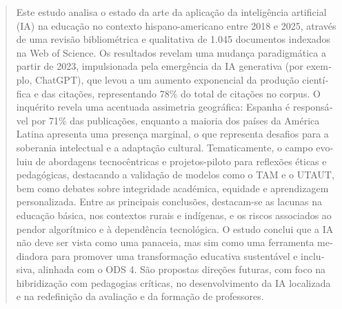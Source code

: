 \documentclass[spanish]{textolivre}
\begin{document}
\begin{polyabstract}
\begin{portuguese}
\begin{abstract}
Este estudo analisa o estado da arte da aplicação da inteligência artificial (IA) na educação no contexto hispano-americano entre 2018 e 2025, através de uma revisão bibliométrica e qualitativa de 1.045 documentos indexados na Web of Science. Os resultados revelam uma mudança paradigmática a partir de 2023, impulsionada pela emergência da IA generativa (por exemplo, ChatGPT), que levou a um aumento exponencial da produção científica e das citações, representando 78\% do total de citações no corpus. O inquérito revela uma acentuada assimetria geográfica: Espanha é responsável por 71\% das publicações, enquanto a maioria dos países da América Latina apresenta uma presença marginal, o que representa desafios para a soberania intelectual e a adaptação cultural. Tematicamente, o campo evoluiu de abordagens tecnocêntricas e projetos-piloto para reflexões éticas e pedagógicas, destacando a validação de modelos como o TAM e o UTAUT, bem como debates sobre integridade académica, equidade e aprendizagem personalizada. Entre as principais conclusões, destacam-se as lacunas na educação básica, nos contextos rurais e indígenas, e os riscos associados ao pendor algorítmico e à dependência tecnológica. O estudo conclui que a IA não deve ser vista como uma panaceia, mas sim como uma ferramenta mediadora para promover uma transformação educativa sustentável e inclusiva, alinhada com o ODS 4. São propostas direções futuras, com foco na hibridização com pedagogias críticas, no desenvolvimento da IA localizada e na redefinição da avaliação e da formação de professores.


\end{abstract}
\end{portuguese}
\end{polyabstract}
\end{document}
